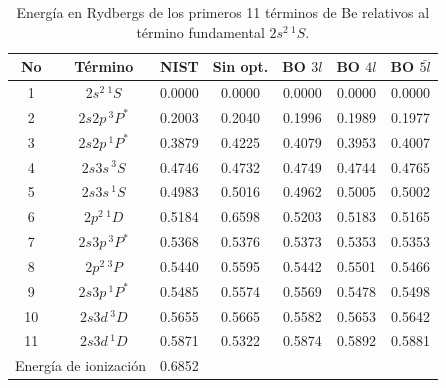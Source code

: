 \begin{table}
\centering
\begin{tabular}{|cc|ccccc|}
\hline 
No & Término      & NIST & Sin opt. & BO $3l$ & BO $4l$ & BO $\bar{5l}$ \\
\hline 
\hline 
1 & $2s^2\,^1S$   & 0.0000 & 0.0000 & 0.0000 & 0.0000 & 0.0000 \\
2 & $2s2p\,^3P^*$ & 0.2003 & 0.2040 & 0.1996 & 0.1989 & 0.1977 \\
3 & $2s2p\,^1P^*$ & 0.3879 & 0.4225 & 0.4079 & 0.3953 & 0.4007 \\
4 & $2s3s\,^3S$   & 0.4746 & 0.4732 & 0.4749 & 0.4744 & 0.4765 \\
5 & $2s3s\,^1S$   & 0.4983 & 0.5016 & 0.4962 & 0.5005 & 0.5002 \\
6 & $2p^2\,^1D$   & 0.5184 & 0.6598 & 0.5203 & 0.5183 & 0.5165 \\
7 & $2s3p\,^3P^*$ & 0.5368 & 0.5376 & 0.5373 & 0.5353 & 0.5353 \\
8 & $2p^2\,^3P$   & 0.5440 & 0.5595 & 0.5442 & 0.5501 & 0.5466 \\
9 & $2s3p\,^1P^*$ & 0.5485 & 0.5574 & 0.5569 & 0.5478 & 0.5498 \\
10 & $2s3d\,^3D$  & 0.5655 & 0.5665 & 0.5582 & 0.5653 & 0.5642 \\
11 & $2s3d\,^1D$  & 0.5871 & 0.5322 & 0.5874 & 0.5892 & 0.5881 \\
\hline
\multicolumn{2}{l}{Energía de ionización} & 0.6852 &  &  &  &  \\ 
\hline
\end{tabular}
\caption{Energía en Rydbergs de los primeros 11 términos de Be relativos 
al término fundamental $2s^2\,^1S$.}
\label{tab:exener}
\end{table}

